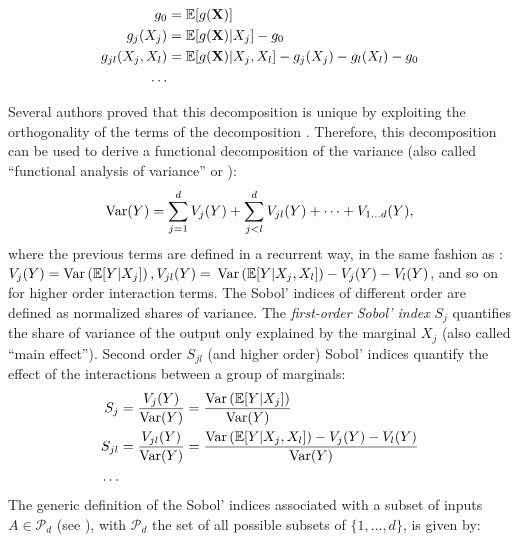 \begin{subequations}
    \begin{align}
        g_0 &= \mathbb{E}[g({\bf X})]\\
        g_j(X_j) &= \mathbb{E}[g({\bf X}) | X_j] - g_0\\
        g_{jl}(X_j, X_l) &= \mathbb{E}[g({\bf X}) | X_j, X_l] - g_j(X_j) - g_l(X_l) - g_0\\
        \dots
    \end{align}
    \label{eq:hoeffding_terms}
\end{subequations}

Several authors proved that this decomposition is unique by exploiting the orthogonality of the terms of the decomposition \citep{efron_1981,sobol_1993}. 
Therefore, this decomposition can be used to derive a functional decomposition of the variance (also called ``functional analysis of variance'' or ):
\begin{equation}
    \operatorname{Var}(Y) = \sum_{j=1}^{d} V_j(Y)  + \sum_{j<l}^{d} V_{jl}(Y) + \dots + V_{1 \dots d}(Y), 
    \label{eq:fanova}
\end{equation}
where the previous terms are defined in a recurrent way, in the same fashion as :  $V_j(Y) = \operatorname{Var}\left(\mathbb{E}[Y|X_j]\right), V_{jl}(Y) =$ \allowbreak $\operatorname{Var}\left(\mathbb{E}[Y|X_j, X_l]\right) - V_j(Y) - V_l(Y)$, and so on for higher order interaction terms. 
The Sobol' indices of different order are defined as normalized shares of variance. 
The \textit{first-order Sobol' index} $S_j$ quantifies the share of variance of the output only explained by the marginal $X_j$ (also called ``main effect''). 
Second order $S_{jl}$ (and higher order) Sobol' indices quantify the effect of the interactions between a group of marginals: 
\begin{subequations}
    \begin{align}
        S_j &= \frac{V_j(Y)}{\operatorname{Var}(Y)} = \frac{\operatorname{Var}\left(\mathbb{E}[Y|X_j]\right)}{\operatorname{Var}(Y)}\\
        S_{jl} &= \frac{V_{jl}(Y)}{\operatorname{Var}(Y)} = \frac{\operatorname{Var}\left(\mathbb{E}[Y|X_j, X_l]\right) - V_j(Y) - V_l(Y)}{\operatorname{Var}(Y)}\\
        \dots
        \label{eq:sobol_first}
    \end{align}
\end{subequations}
The generic definition of the Sobol' indices associated with a subset of inputs $A \in \mathcal{P}_d$ (see \citealp{daveiga_iooss_2021}), with $\mathcal{P}_d$ the set of all possible subsets of $\{1, \dots, d\}$, is given by:
